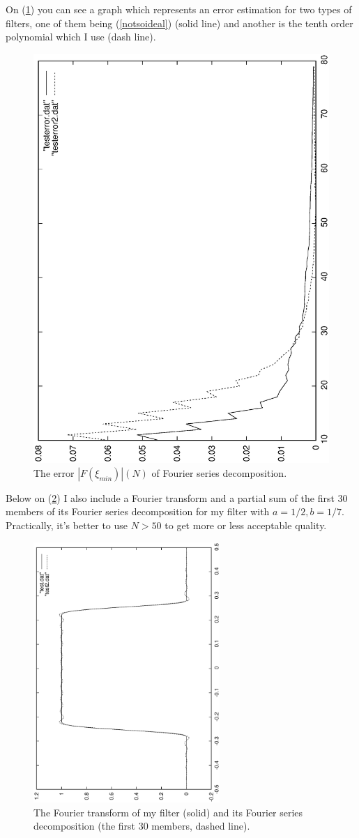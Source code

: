\documentclass[a4paper,11pt,fleqn]{article}
\let\oldref\ref
\renewcommand{\ref}[1]{(\oldref{#1})}
\begin{document}
On \ref{errorpic} you can see a graph which represents an error estimation for two types of filters, one of them being \ref{notsoideal} (solid line) and another is the tenth order polynomial which I use (dash line).
\begin{figure}[h!]
\includegraphics[width=0.5\linewidth,angle=-90]{error.ps}
\caption{The error $\left|F(\xi_{min})\right|(N)$ of Fourier series decomposition.}
\label{errorpic}
\end{figure}

Below on \ref{filterpic} I also include a Fourier transform and a partial sum of the first 30 members of its Fourier series decomposition for my filter with $a=1/2, b=1/7$. Practically, it's better to use $N>50$ to get
more or less acceptable quality.
\begin{figure}[h!]
\includegraphics[width=200pt,angle=-90]{approx.ps}
\caption{The Fourier transform of my filter (solid) and its Fourier series decomposition (the first 30 members, dashed line).}
\label{filterpic}
\end{figure}
\end{document}
